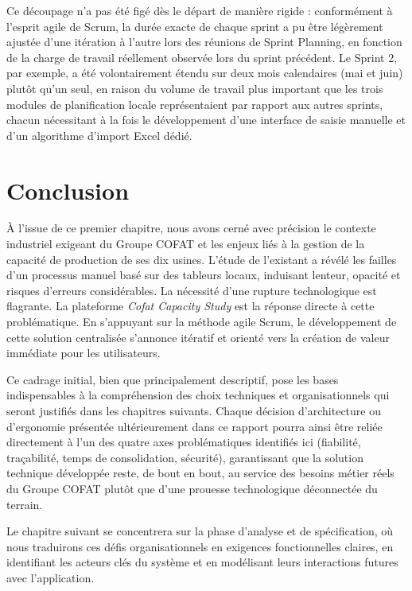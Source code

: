 Ce découpage n'a pas été figé dès le départ de manière rigide : conformément à l'esprit agile de Scrum, la durée exacte de chaque sprint a pu être légèrement ajustée d'une itération à l'autre lors des réunions de Sprint Planning, en fonction de la charge de travail réellement observée lors du sprint précédent. Le Sprint 2, par exemple, a été volontairement étendu sur deux mois calendaires (mai et juin) plutôt qu'un seul, en raison du volume de travail plus important que les trois modules de planification locale représentaient par rapport aux autres sprints, chacun nécessitant à la fois le développement d'une interface de saisie manuelle et d'un algorithme d'import Excel dédié.


\section{Conclusion}
À l'issue de ce premier chapitre, nous avons cerné avec précision le contexte industriel exigeant du Groupe COFAT et les enjeux liés à la gestion de la capacité de production de ses dix usines. L'étude de l'existant a révélé les failles d'un processus manuel basé sur des tableurs locaux, induisant lenteur, opacité et risques d'erreurs considérables. La nécessité d'une rupture technologique est flagrante. La plateforme \textit{Cofat Capacity Study} est la réponse directe à cette problématique. En s'appuyant sur la méthode agile Scrum, le développement de cette solution centralisée s'annonce itératif et orienté vers la création de valeur immédiate pour les utilisateurs. 

Ce cadrage initial, bien que principalement descriptif, pose les bases indispensables à la compréhension des choix techniques et organisationnels qui seront justifiés dans les chapitres suivants. Chaque décision d'architecture ou d'ergonomie présentée ultérieurement dans ce rapport pourra ainsi être reliée directement à l'un des quatre axes problématiques identifiés ici (fiabilité, traçabilité, temps de consolidation, sécurité), garantissant que la solution technique développée reste, de bout en bout, au service des besoins métier réels du Groupe COFAT plutôt que d'une prouesse technologique déconnectée du terrain.

Le chapitre suivant se concentrera sur la phase d'analyse et de spécification, où nous traduirons ces défis organisationnels en exigences fonctionnelles claires, en identifiant les acteurs clés du système et en modélisant leurs interactions futures avec l'application.
